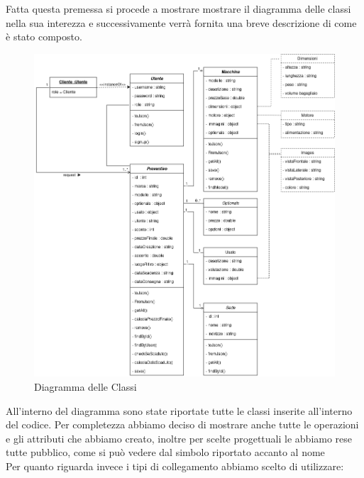 \documentclass[a4paper, 11pt,oneside]{book}
\newcommand{\spacing}{\par\bigskip\noindent}
\begin{document}
    Fatta questa premessa si procede a mostrare mostrare il diagramma delle classi nella sua interezza e successivamente verrà fornita una breve descrizione di come è stato composto.
    \begin{figure}[H]
        \includegraphics[width=\textwidth]{diagramma_delle_classi.png}
        \caption{Diagramma delle Classi}
        \label{fig:diagramma_delle_classi}
    \end{figure}
    \spacing
    All'interno del diagramma sono state riportate tutte le classi inserite all'interno del codice. Per completezza abbiamo deciso di mostrare anche tutte le operazioni e gli attributi che abbiamo creato, inoltre per scelte progettuali le abbiamo rese tutte
    pubblico, come si può vedere dal simbolo riportato accanto al nome\\
    Per quanto riguarda invece i tipi di collegamento abbiamo scelto di utilizzare:
\end{document}
